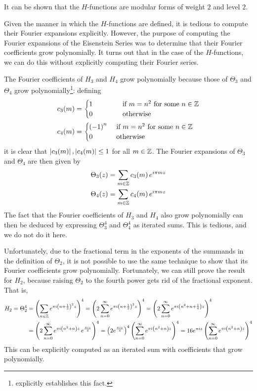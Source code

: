 It can be shown that the $H$-functions are modular forms of weight $2$ and level $2$.

Given the manner in which the $H$-functions are defined, it is tedious to compute their Fourier expansions explicitly. However, the purpose of computing the Fourier expansions of the Eisenstein Series was to determine that their Fourier coefficients grow polynomially. It turns out that in the case of the $H$-functions, we can do this without explicitly computing their Fourier series.

The Fourier coefficients of $H_3$ and $H_4$ grow polynomially because those of $\Theta_3$ and $\Theta_4$ grow polynomially\footnote{ explicitly establishes this fact.}: defining
\begin{align*}
    c_3(m) &=
    \begin{cases}
        1 \quad\quad\quad & \text{ if } m = n^2 \text{ for some } n \in \mathbb{Z} \\
        0 \quad\quad\quad & \text{ otherwise}
    \end{cases} \\
    c_4(m) &=
    \begin{cases}
        \left( -1 \right)^n & \text{ if } m = n^2 \text{ for some } n \in \mathbb{Z} \\
        0 & \text{ otherwise}
    \end{cases}
\end{align*}
it is clear that $\left\lvert c_3(m) \right\rvert, \left\lvert c_4(m) \right\rvert \leq 1$ for all $m \in \mathbb{Z}$. The Fourier expansions of $\Theta_3$ and $\Theta_4$ are then given by
\begin{align*}
    \Theta_{3}\!\left( z \right) &= \sum_{m \in \mathbb{Z}} c_3(m) \, e^{i\pi m z} \\
    \Theta_{4}\!\left( z \right) &= \sum_{m \in \mathbb{Z}} c_4(m) \, e^{i\pi m z}
\end{align*}
The fact that the Fourier coefficients of $H_3$ and $H_4$ also grow polynomially can then be deduced by expressing $\Theta_3^4$ and $\Theta_4^4$ as iterated sums. This is tedious, and we do not do it here.

Unfortunately, due to the fractional term in the exponents of the summands in the definition of $\Theta_2$, it is not possible to use the same technique to show that its Fourier coefficients grow polynomially. Fortunately, we can still prove the result for $H_2$, because raising $\Theta_2$ to the fourth power gets rid of the fractional exponent. That is,
\begin{align}
    H_2 = \Theta_2^4
    &= \left( \sum_{n \in \mathbb{Z}} e^{\pi i \left( n + \frac{1}{2} \right)^2 z} \right)^4
    = \left( 2\sum_{n =0}^{\infty} e^{\pi i \left( n + \frac{1}{2} \right)^2 z} \right)^4
    = \left( 2\sum_{n =0}^{\infty} e^{\pi i \left( n^2 + n + \frac{1}{4} \right) z} \right)^4 \nonumber \\
    &= \left( 2\sum_{n =0}^{\infty} e^{\pi i \left( n^2 + n \right) z} \, e^{\frac{\pi i z}{4}} \right)^4
    = \left( 2e^{\frac{\pi i z}{4}} \right)^4  \left( \sum_{n =0}^{\infty} e^{\pi i \left( n^2 + n \right) z} \right)^4
    = 16 e^{\pi i z} \left( \sum_{n =0}^{\infty} e^{\pi i \left( n^2 + n \right) z} \right)^4 \label{Ch2:Eq:H2_qexpansion_explicit}
\end{align}
This can be explicitly computed as an iterated sum with coefficients that grow polynomially.

